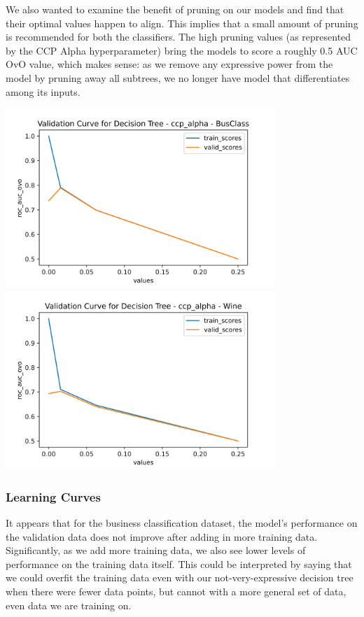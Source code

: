 \documentclass[
	letterpaper, %
]{jdf}
\begin{document}
We also wanted to examine the benefit of pruning on our models and find that their optimal values happen to align. This implies that a small amount of pruning is recommended for both the classifiers. The high pruning values (as represented by the CCP Alpha hyperparameter) bring the models to score a roughly 0.5 AUC OvO value, which makes sense: as we remove any expressive power from the model by pruning away all subtrees, we no longer have model that differentiates among its inputs.

\includegraphics[width=4in]{Figures/BusClass-0920/DT/val_curve_1.png}
\includegraphics[width=4in]{Figures/Wine-0921/DT/val_curve_1.png}

\subsubsection{Learning Curves}
It appears that for the business classification dataset, the model's performance on the validation data does not improve after adding in more training data. Significantly, as we add more training data, we also see lower levels of performance on the training data itself. This could be interpreted by saying that we could overfit the training data even with our not-very-expressive decision tree when there were fewer data points, but cannot with a more general set of data, even data we are training on.
\end{document}
